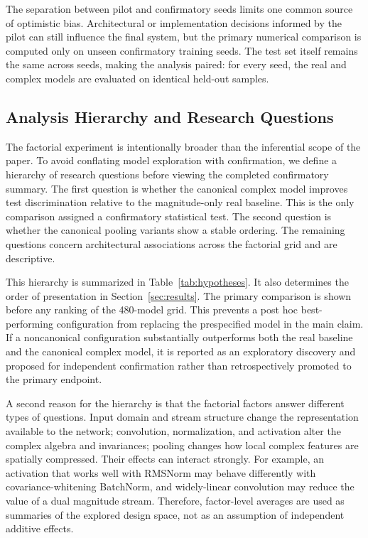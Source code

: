 \documentclass[journal]{IEEEtran}
\begin{document}
The separation between pilot and confirmatory seeds limits one common source of optimistic bias. Architectural or implementation decisions informed by the pilot can still influence the final system, but the primary numerical comparison is computed only on unseen confirmatory training seeds. The test set itself remains the same across seeds, making the analysis paired: for every seed, the real and complex models are evaluated on identical held-out samples.

\subsection{Analysis Hierarchy and Research Questions}
The factorial experiment is intentionally broader than the inferential scope of the paper. To avoid conflating model exploration with confirmation, we define a hierarchy of research questions before viewing the completed confirmatory summary. The first question is whether the canonical complex model improves test discrimination relative to the magnitude-only real baseline. This is the only comparison assigned a confirmatory statistical test. The second question is whether the canonical pooling variants show a stable ordering. The remaining questions concern architectural associations across the factorial grid and are descriptive.

This hierarchy is summarized in Table~\ref{tab:hypotheses}. It also determines the order of presentation in Section~\ref{sec:results}. The primary comparison is shown before any ranking of the 480-model grid. This prevents a post hoc best-performing configuration from replacing the prespecified model in the main claim. If a noncanonical configuration substantially outperforms both the real baseline and the canonical complex model, it is reported as an exploratory discovery and proposed for independent confirmation rather than retrospectively promoted to the primary endpoint.

A second reason for the hierarchy is that the factorial factors answer different types of questions. Input domain and stream structure change the representation available to the network; convolution, normalization, and activation alter the complex algebra and invariances; pooling changes how local complex features are spatially compressed. Their effects can interact strongly. For example, an activation that works well with RMSNorm may behave differently with covariance-whitening BatchNorm, and widely-linear convolution may reduce the value of a dual magnitude stream. Therefore, factor-level averages are used as summaries of the explored design space, not as an assumption of independent additive effects.
\end{document}

